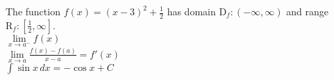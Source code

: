 \documentclass[11pt]{article}
\begin{document}
  The function $f(x)=(x-3)^2+\frac{1}{2}$ has domain $\mathrm{D}_f:(-\infty,\infty)$
  and range $\mathrm{R}_f:\left[\frac{1}{2},\infty\right]$.\\

  $\lim\limits_{x \to a^-} f(x)$\\

  $\displaystyle{\lim\limits_{x \to a} \frac{f(x)-f(a)}{x-a}=f'(x)}$\\

  $\displaystyle{\int \sin x \,dx=-\cos x + C}$
\end{document}
